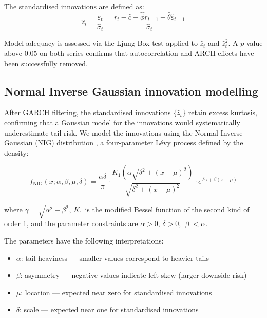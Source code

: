 \documentclass[12pt, a4paper]{article}
\begin{document}
The standardised innovations are defined as:
\begin{equation}
  \hat{z}_t = \frac{\varepsilon_t}{\hat{\sigma}_t} 
             = \frac{r_t - \hat{c} - \hat{\phi} r_{t-1} 
               - \hat{\theta}\hat{\varepsilon}_{t-1}}{\hat{\sigma}_t}
\end{equation}

Model adequacy is assessed via the Ljung-Box test applied to 
$\hat{z}_t$ and $\hat{z}_t^2$. A $p$-value above 0.05 on both 
series confirms that autocorrelation and ARCH effects have been 
successfully removed.

\subsection{Normal Inverse Gaussian innovation modelling}

After GARCH filtering, the standardised innovations 
$\{\hat{z}_t\}$ retain excess kurtosis, confirming that a 
Gaussian model for the innovations would systematically 
underestimate tail risk. We model the innovations using the 
Normal Inverse Gaussian (NIG) distribution 
\citep{barndorff1997}, a four-parameter L\'{e}vy process defined 
by the density:

\begin{equation}
  f_{\text{NIG}}(x; \alpha, \beta, \mu, \delta) = 
  \frac{\alpha \delta}{\pi} \cdot
  \frac{K_1\!\left(\alpha\sqrt{\delta^2 + (x-\mu)^2}\right)}
       {\sqrt{\delta^2 + (x-\mu)^2}} \cdot
  e^{\,\delta\gamma + \beta(x-\mu)}
  \label{eq:nig}
\end{equation}

where $\gamma = \sqrt{\alpha^2 - \beta^2}$, $K_1$ is the modified 
Bessel function of the second kind of order 1, and the parameter 
constraints are $\alpha > 0$, $\delta > 0$, 
$|\beta| < \alpha$.

The parameters have the following interpretations:
\begin{itemize}
  \item $\alpha$: tail heaviness --- smaller values correspond to 
        heavier tails
  \item $\beta$: asymmetry --- negative values indicate left skew 
        (larger downside risk)
  \item $\mu$: location --- expected near zero for standardised 
        innovations
  \item $\delta$: scale --- expected near one for standardised 
        innovations
\end{itemize}
\end{document}
